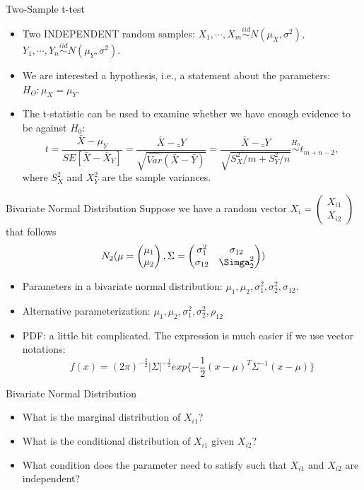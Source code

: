 \documentclass[landscape]{slides}
\begin{document}
\begin{slide}{\Large Two-Sample t-test}
\begin{itemize}
    \item Two INDEPENDENT random samples: $X_1,\cdots,X_m\overset{iid}\sim N(\mu_X,\sigma^2)$, $Y_1,\cdots,Y_n\overset{iid}\sim N(\mu_Y,\sigma^2)$. 
    \item We are interested a hypothesis, i.e., a statement about the parameters: $H_O: \mu_X=\mu_Y$.
    \item The t-statistic can be used to examine whether we have enough evidence to be against $H_0$:
    $$t=\frac{\bar X - \mu_Y}{SE[\bar X - \bar X_Y]}=\frac{\bar X - \bar_Y}{\sqrt{ \hat{Var}(\bar X-\bar Y)}}=\frac{\bar X - \bar_Y}{\sqrt{S_X^2/m+S_Y^2/n}}\overset{H_0}\sim t_{m+n-2},$$
    where $S_X^2$ and $X_Y^2$ are the sample variances.
\end{itemize}
\end{slide}

\begin{slide}{\Large Bivariate Normal Distribution}
Suppose we have a random vector $X_i=\begin{pmatrix}X_{i1}\\X_{i2}\end{pmatrix}$ that follows 
$$N_2(\mu=\begin{pmatrix}\mu_1\\ \mu_2\end{pmatrix}, \Sigma=\begin{pmatrix}\sigma_{1}^2 & \sigma_{12}\\
\sigma_{12}& \Simga_{2}^2\end{pmatrix})$$
\begin{itemize}
    \item Parameters in a bivariate normal distribution: $\mu_1, \mu_2, \sigma_1^2, \sigma_2^2, \sigma_{12}$.
    \item Alternative parameterization: $\mu_1, \mu_2, \sigma_1^2, \sigma_2^2, \rho_{12}$
    \item PDF: a little bit complicated. The expression is much easier if we use vector notations:
    $$f(x)=(2\pi)^{-\frac{2}{2}}|\Sigma|^{-\frac{1}{2}}exp\{-\frac{1}{2}(x-\mu)^T\Sigma^{-1}(x-\mu)\}$$
\end{itemize}
\end{slide}

\begin{slide}{\Large Bivariate Normal Distribution}
\begin{itemize}
    \item What is the marginal distribution of $X_{i1}$?
    \item What is the conditional distribution of $X_{i1}$ given $X_{i2}$?
    \item What condition does the parameter need to satisfy such that $X_{i1}$ and $X_{i2}$ are independent?
\end{itemize}
\end{slide}
\end{document}
